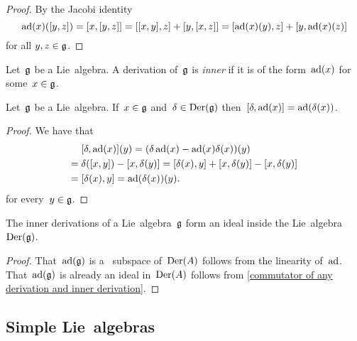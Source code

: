 \begin{proof}
  By the Jacobi identity
  \[
    \operatorname{ad}(x)([y,z])
    =
    [x,[y,z]]
    =
    [[x,y],z] + [y,[x,z]] \\
    =
    [\operatorname{ad}(x)(y), z] + [y, \operatorname{ad}(x)(z)]
  \]
  for all $y,z \in \mathfrak{g}$.
\end{proof}


\begin{definition}
 Let~$\mathfrak{g}$ be a Lie~algebra.
 A derivation of~$\mathfrak{g}$ is \emph{inner} if it is of the form~$\operatorname{ad}(x)$ for some~$x \in \mathfrak{g}$.
\end{definition}


\begin{lemma}
  \label{commutator of any derivation and inner derivation}
  Let~$\mathfrak{g}$ be a Lie~algebra.
  If~$x \in \mathfrak{g}$ and~$\delta \in \operatorname{Der}(\mathfrak{g})$ then~$[\delta, \operatorname{ad}(x)] = \operatorname{ad}(\delta(x))$.
\end{lemma}


\begin{proof}
 We have that
 \begin{align*}
  {}&
  [\delta, \operatorname{ad}(x)](y)
  =
  (\delta \operatorname{ad}(x) - \operatorname{ad}(x) \delta(x))(y) \\
  ={}&
  \delta([x,y]) - [x,\delta(y)]
  =
  [\delta(x),y] + [x,\delta(y)] - [x,\delta(y)] \\
  ={}&
  [\delta(x),y]
  =
  \operatorname{ad}(\delta(x))(y).
 \end{align*}
 for every~$y \in \mathfrak{g}$.
\end{proof}


\begin{corollary}
  \label{inner derivations are an ideal}
  The inner derivations of a Lie~algebra~$\mathfrak{g}$ form an ideal inside the Lie~algebra~$\operatorname{Der}(\mathfrak{g})$.
\end{corollary}

\begin{proof}
  That~$\operatorname{ad}(\mathfrak{g})$ is a~{\linear{$\kf$}} subspace of~$\operatorname{Der}(A)$ follows from the linearity of~$\operatorname{ad}$.
  That~$\operatorname{ad}(\mathfrak{g})$ is already an ideal in~$\operatorname{Der}(A)$ follows from \cref{commutator of any derivation and inner derivation}.
\end{proof}







\subsection{Simple Lie~algebras}


